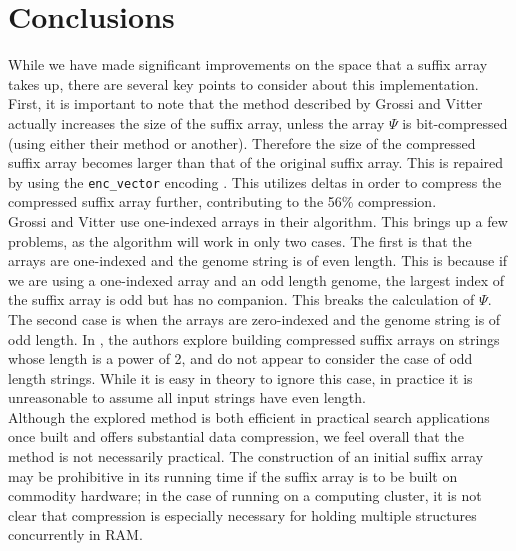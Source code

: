 \documentclass{article}
\begin{document}
\section{Conclusions}
\label{sec-conclusions}
While we have made significant improvements on the space that a suffix array takes up, there are several key points to consider about this implementation.\\
\indent First, it is important to note that the method described by Grossi and Vitter actually increases the size of the suffix array, unless the array $\Psi$ is bit-compressed (using either their method or another). Therefore the size of the compressed suffix array becomes larger than that of the original suffix array. This is repaired by using the \texttt{enc\_vector} encoding \cite{E75, SDSL}. This utilizes deltas in order to compress the compressed suffix array further, contributing to the 56\% compression.\\
\indent Grossi and Vitter use one-indexed arrays in their algorithm. This brings up a few problems, as the algorithm will work in only two cases. The first is that the arrays are one-indexed and the genome string is of even length. This is because if we are using a one-indexed array and an odd length genome, the largest index of the suffix array is odd but has no companion. This breaks the calculation of $\Psi$. The second case is when the arrays are zero-indexed and the genome string is of odd length. In \cite{GV05}, the authors explore building compressed suffix arrays on strings whose length is a power of 2, and do not appear to consider the case of odd length strings. While it is easy in theory to ignore this case, in practice it is unreasonable to assume all input strings have even length.\\
\indent Although the explored method is both efficient in practical search applications once built and offers substantial data compression, we feel overall that the method is not necessarily practical. The construction of an initial suffix array may be prohibitive in its running time if the suffix array is to be built on commodity hardware; in the case of running on a computing cluster, it is not clear that compression is especially necessary for holding multiple structures concurrently in RAM.
\clearpage
\end{document}
